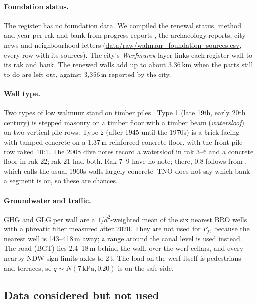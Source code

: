 \paragraph{Foundation status.} The register has no foundation data. We
compiled the renewal status, method and year per rak and bank from progress
reports \parencite{antea2019,gu2025up}, the archaeology reports, city news
and neighbourhood letters (\url{data/raw/walmuur_foundation_sources.csv},
every row with its sources). The city's \emph{Werfmuren} layer links each
register wall to its rak and bank. The renewed walls add up to about 3.36\,km
when the parts still to do are left out, against 3{,}356\,m reported by the
city.

\paragraph{Wall type.} Two types of low walmuur stand on timber piles
\cite{ibu2010}. Type 1 (late 19th, early 20th century) is stepped masonry on a
timber floor with a timber beam (\emph{watersloof}) on two vertical pile rows.
Type 2 (after 1945 until the 1970s) is a brick facing with tamped concrete on
a 1.37\,m reinforced concrete floor, with the front pile row raked 10:1. The
2008 dive notes \cite{tno2009} record a watersloof in rak 3--6 and a concrete
floor in rak 22; rak 21 had both. Rak 7--9 have no note; there, 0.8 follows
from \textcite{erfgoed156}, which calls the usual 1960s walls largely concrete.
TNO does not say which bank a segment is on, so these are chances.

\paragraph{Groundwater and traffic.} GHG and GLG per wall are a
$1/d^2$-weighted mean of the six nearest BRO wells with a phreatic filter
measured after 2020. They are not used for $P_f$, because the nearest well is
143--418\,m away; a range around the canal level is used instead. The road
(BGT) lies 2.4--18\,m behind the wall, over the werf cellars, and every nearby
NDW sign limits axles to 2\,t. The load on the werf itself is pedestrians and
terraces, so $q \sim N(7\,\text{kPa}, 0.20)$ is on the safe side.

\subsection{Data considered but not used}\label{app:data-unused}

